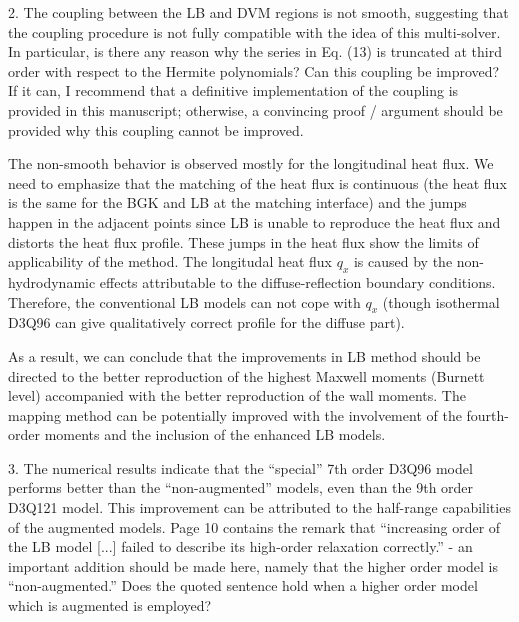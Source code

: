 \documentclass{article}
\begin{document}
\begin{quoting}
    2. The coupling between the LB and DVM regions is not
    smooth, suggesting that the coupling procedure is not
    fully compatible with the idea of this multi-solver.
    In particular, is there any reason why the series in
    Eq. (13) is truncated at third order with respect to
    the Hermite polynomials? Can this coupling be improved?
    If it can, I recommend that a definitive implementation
    of the coupling is provided in this manuscript; otherwise,
    a convincing proof / argument should be provided why this
    coupling cannot be improved.
\end{quoting}

The non-smooth behavior is observed mostly for the longitudinal heat flux.
We need to emphasize that the matching of the heat flux is continuous
(the heat flux is the same for the BGK and LB at the matching interface)
and the jumps happen in the adjacent points
since LB is unable to reproduce the heat flux and distorts the heat flux profile.
These jumps in the heat flux show the limits of applicability of the method.
The longitudal heat flux $q_x$ is caused by the non-hydrodynamic effects
attributable to the diffuse-reflection boundary conditions.
Therefore, the conventional LB models can not cope with $q_x$
(though isothermal D3Q96 can give qualitatively correct profile for the diffuse part).

As a result, we can conclude that the improvements in LB method should be directed
to the better reproduction of the highest Maxwell moments (Burnett level)
accompanied with the better reproduction of the wall moments.
The mapping method can be potentially improved with the involvement of the fourth-order moments
and the inclusion of the enhanced LB models.

\begin{quoting}
    3. The numerical results indicate that the ``special''
    7th order D3Q96 model performs better than the
    ``non-augmented'' models, even than the 9th order
    D3Q121 model. This improvement can be attributed to
    the half-range capabilities of the augmented models.
    Page 10 contains the remark that ``increasing order of
    the LB model [...] failed to describe its high-order
    relaxation correctly.'' - an important addition should
    be made here, namely that the higher order model is
    ``non-augmented.'' Does the quoted sentence hold when
    a higher order model which is augmented is employed?
\end{quoting}
\end{document}
